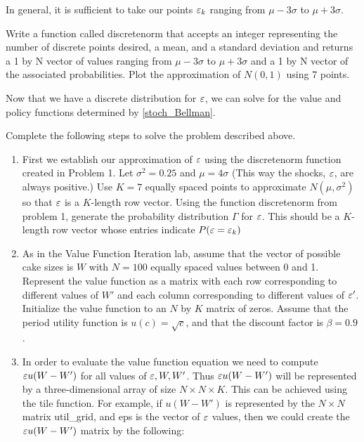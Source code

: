 In general, it is sufficient to take our points $\varepsilon_k$ ranging from $\mu - 3\sigma$ to $\mu + 3\sigma$.

\begin{problem}
Write a function called discretenorm that accepts an integer representing the number of discrete points desired, a mean, and a standard deviation and returns a 1 by N vector of values ranging from $\mu - 3\sigma$ to $\mu + 3\sigma$  and a 1 by N vector of the associated probabilities.  Plot the approximation of $N(0,1)$ using 7 points.
\end{problem}

Now that we have a discrete distribution for $\varepsilon$, we can solve for the value and policy functions determined by \eqref{stoch_Bellman}.

\begin{problem}
Complete the following steps to solve the problem described above.
\begin{enumerate}
   \item First we establish our approximation of $\varepsilon$ using the discretenorm function created in Problem 1. Let $\sigma^2 = 0.25$ and $\mu=4\sigma$ (This way the shocks, $\varepsilon$, are always positive.) Use $K=7$ equally spaced points to approximate $N(\mu,\sigma^2)$ so that $\varepsilon$ is a $K$-length row vector.  Using the function discretenorm from problem 1, generate the probability distribution $\Gamma$ for $\varepsilon$. This should be a $K$-length row vector whose entries indicate $P(\varepsilon = \varepsilon_k)$

   \item As in the Value Function Iteration lab, assume that the vector of possible cake sizes is $W$ with $N=100$ equally spaced values between 0 and 1.  Represent the value function as a matrix with each row corresponding to different values of $W'$ and each column corresponding to different values of $\varepsilon'$. Initialize the value function to an $N$ by $K$ matrix of zeros.  Assume that the period utility function is $u(c)=\sqrt{c}$, and that the discount factor is $\beta = 0.9$.


   \item In order to evaluate the value function equation we need to compute $\varepsilon u(W-W')$ for all values of $\varepsilon,W,W'$.  Thus $\varepsilon u(W-W')$ will be represented by a three-dimensional array of size $N\times N\times K$.  This can be achieved using the tile function.  For example, if $u(W-W')$ is represented by the $N\times N$ matrix util\_grid, and eps is the vector of $\varepsilon$ values, then we could create the $\varepsilon u(W-W')$ matrix by the following:


\end{enumerate}
\end{problem}
